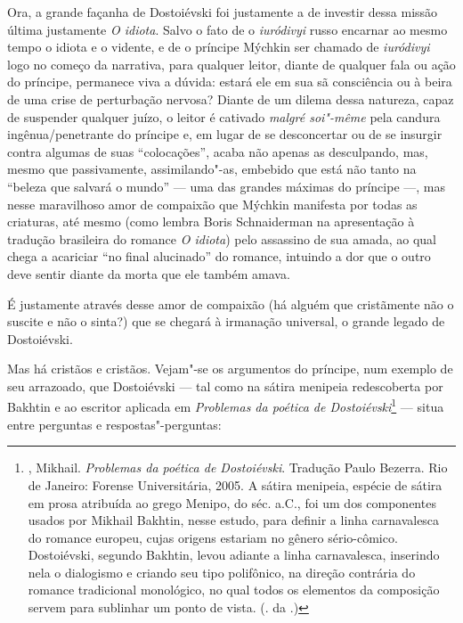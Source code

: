 Ora, a grande façanha de Dostoiévski foi justamente a de investir
dessa missão última justamente \emph{O idiota}. Salvo o fato de
o \emph{iuródivyi} russo encarnar ao mesmo tempo o idiota e o
vidente, e de o príncipe Mýchkin ser chamado de \emph{iuródivyi}
logo no começo da narrativa, para qualquer leitor, diante de
qualquer fala ou ação do príncipe, permanece viva a dúvida:
estará ele em sua sã consciência ou à beira de uma crise de
perturbação nervosa? Diante de um dilema dessa natureza, capaz
de suspender qualquer juízo, o leitor é cativado \emph{malgré
soi"-même} pela candura ingênua/penetrante do príncipe e, em
lugar de se desconcertar ou de se insurgir contra algumas de
suas ``colocações'', acaba não apenas as desculpando, mas,
mesmo que passivamente, assimilando"-as, embebido que está não
tanto na ``beleza que salvará o mundo'' --- uma das grandes
máximas do príncipe ---, mas nesse maravilhoso amor de
compaixão que Mýchkin manifesta por todas as criaturas, até
mesmo (como lembra Boris Schnaiderman na apresentação à
tradução brasileira do romance \emph{O idiota}) pelo
assassino de sua amada, ao qual chega a acariciar ``no final
alucinado'' do romance, intuindo a dor que o outro deve sentir
diante da morta que ele também amava.

É justamente através desse amor de compaixão (há alguém que cristãmente não o suscite e não o sinta?) que se chegará à irmanação universal, o grande legado de Dostoiévski.

Mas há cristãos e cristãos. Vejam"-se os argumentos do príncipe,
num exemplo de seu arrazoado, que Dostoiévski --- tal como na
sátira menipeia redescoberta por Bakhtin e ao escritor aplicada em
\emph{Problemas da poética de Dostoiévski}\footnote{, Mikhail.
\emph{Problemas da poética de Dostoiévski}. Tradução Paulo
Bezerra. Rio de Janeiro: Forense Universitária, 2005. A sátira
menipeia, espécie de sátira em prosa atribuída ao grego Menipo,
do séc.  a.C., foi um dos componentes usados por
Mikhail Bakhtin, nesse estudo, para definir a linha carnavalesca
do romance europeu, cujas origens estariam no gênero sério-cômico. Dostoiévski, segundo Bakhtin, levou adiante a linha carnavalesca, inserindo nela o dialogismo e criando seu tipo polifônico, na direção contrária do romance tradicional monológico, no qual todos os elementos da composição servem para sublinhar um ponto de vista. (. da .)} --- situa entre perguntas e respostas"-perguntas:

